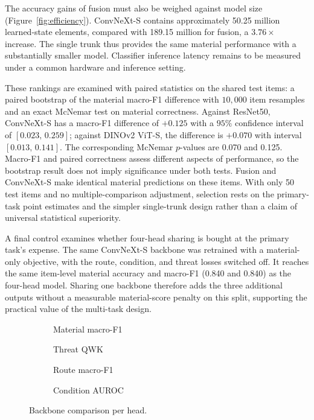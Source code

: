 The accuracy gains of fusion must also be weighed against model size (Figure~\ref{fig:efficiency}). ConvNeXt-S contains approximately 50.25 million learned-state elements, compared with 189.15 million for fusion, a $3.76\times$ increase. The single trunk thus provides the same material performance with a substantially smaller model. Classifier inference latency remains to be measured under a common hardware and inference setting.

These rankings are examined with paired statistics on the shared test items: a paired bootstrap of the material macro-F1 difference with $10{,}000$ item resamples and an exact McNemar test on material correctness. Against ResNet50, ConvNeXt-S has a macro-F1 difference of $+0.125$ with a $95\%$ confidence interval of $[0.023,\,0.259]$; against DINOv2 ViT-S, the difference is $+0.070$ with interval $[0.013,\,0.141]$. The corresponding McNemar $p$-values are 0.070 and 0.125. Macro-F1 and paired correctness assess different aspects of performance, so the bootstrap result does not imply significance under both tests. Fusion and ConvNeXt-S make identical material predictions on these items. With only 50 test items and no multiple-comparison adjustment, selection rests on the primary-task point estimates and the simpler single-trunk design rather than a claim of universal statistical superiority.

A final control examines whether four-head sharing is bought at the primary task's expense. The same ConvNeXt-S backbone was retrained with a material-only objective, with the route, condition, and threat losses switched off. It reaches the same item-level material accuracy and macro-F1 (0.840 and 0.840) as the four-head model. Sharing one backbone therefore adds the three additional outputs without a measurable material-score penalty on this split, supporting the practical value of the multi-task design.

\begin{figure}[!ht]
    \centering
    \begin{subfigure}{0.48\textwidth}\centering{}\caption{Material macro-F1}\end{subfigure}\hfill
    \begin{subfigure}{0.48\textwidth}\centering{}\caption{Threat QWK}\end{subfigure}

    \vspace{0.5em}
    \begin{subfigure}{0.48\textwidth}\centering{}\caption{Route macro-F1}\end{subfigure}\hfill
    \begin{subfigure}{0.48\textwidth}\centering{}\caption{Condition AUROC}\end{subfigure}
    \caption{Backbone comparison per head.}
    \label{fig:backbones}
\end{figure}

